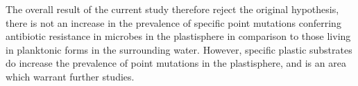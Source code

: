 The overall result of the current study therefore reject the original hypothesis, there is not an increase in the prevalence of specific point mutations conferring antibiotic resistance in microbes in the plastisphere in comparison to those living in planktonic forms in the surrounding water. However, specific plastic substrates do increase the prevalence of point mutations in the plastisphere, and is an area which warrant further studies. 





